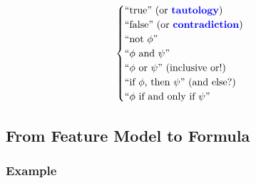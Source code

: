 \begin{frame}{\myframetitle}
\begin{mycolumns}
{\begin{equation*}
\begin{cases}
					\text{``true'' (or \emph{tautology})} \\
					\text{``false'' (or \emph{contradiction})} \\
					\text{``not $\phi$''} \\
					\text{``$\phi$ and $\psi$''} \\
					\text{``$\phi$ or $\psi$'' (inclusive or!)} \\
					\text{``if $\phi$, then $\psi$'' (and else?)} \\
					\text{``$\phi$ if and only if $\psi$''}
				\end{cases}
			\end{equation*}
		}
	\end{mycolumns}
\end{frame}

\subsection{From Feature Model to Formula}

\subsubsection{Example}

